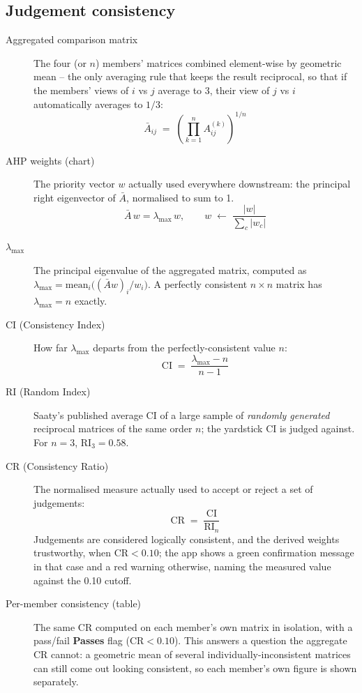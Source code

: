 \documentclass[11pt]{article}
\begin{document}
\subsection{Judgement consistency}
\begin{description}
  \item[Aggregated comparison matrix] The four (or $n$) members' matrices
    combined element-wise by geometric mean -- the only averaging rule that
    keeps the result reciprocal, so that if the members' views of $i$ vs $j$
    average to 3, their view of $j$ vs $i$ automatically averages to $1/3$:
    \[
      \bar A_{ij} \;=\; \left(\prod_{k=1}^{n} A^{(k)}_{ij}\right)^{1/n}
    \]
  \item[AHP weights (chart)] The priority vector $w$ actually used everywhere
    downstream: the principal right eigenvector of $\bar A$, normalised to
    sum to 1.
    \[
      \bar A\,w = \lambda_{\max}\,w, \qquad
      w \;\leftarrow\; \frac{|w|}{\sum_c |w_c|}
    \]
  \item[$\lambda_{\max}$] The principal eigenvalue of the aggregated matrix,
    computed as $\lambda_{\max} = \text{mean}_i\big((\bar A w)_i / w_i\big)$. A
    perfectly consistent $n\times n$ matrix has $\lambda_{\max} = n$ exactly.
  \item[CI (Consistency Index)] How far $\lambda_{\max}$ departs from the
    perfectly-consistent value $n$:
    \[
      \mathrm{CI} \;=\; \frac{\lambda_{\max} - n}{n - 1}
    \]
  \item[RI (Random Index)] Saaty's published average CI of a large sample of
    \emph{randomly generated} reciprocal matrices of the same order $n$; the
    yardstick CI is judged against. For $n=3$, $\mathrm{RI}_3 = 0.58$.
  \item[CR (Consistency Ratio)] The normalised measure actually used to accept
    or reject a set of judgements:
    \[
      \mathrm{CR} \;=\; \frac{\mathrm{CI}}{\mathrm{RI}_n}
    \]
    Judgements are considered logically consistent, and the derived weights
    trustworthy, when $\mathrm{CR} < 0.10$; the app shows a green confirmation
    message in that case and a red warning otherwise, naming the measured
    value against the 0.10 cutoff.
  \item[Per-member consistency (table)] The same CR computed on each member's
    own matrix in isolation, with a pass/fail \textbf{Passes} flag
    ($\mathrm{CR} < 0.10$). This answers a question the aggregate CR cannot: a
    geometric mean of several individually-inconsistent matrices can still
    come out looking consistent, so each member's own figure is shown
    separately.
\end{description}
\end{document}
